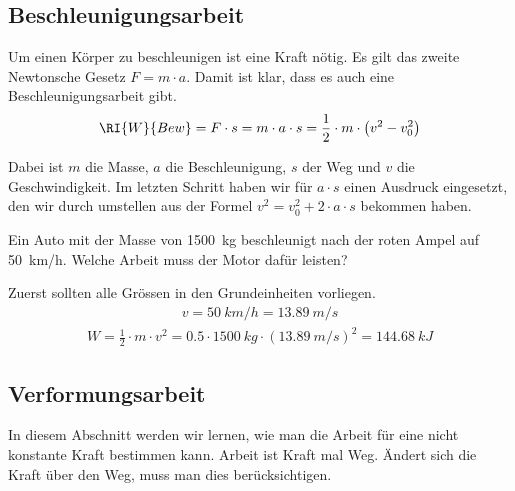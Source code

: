 \documentclass[12pt,a4paper,twoside]{article}
\begin{document}
\subsection*{Beschleunigungsarbeit}
Um einen Körper zu beschleunigen ist eine Kraft nötig. 
Es gilt das zweite Newtonsche Gesetz $F=m\cdot a$.
Damit ist klar, dass es auch eine Beschleunigungsarbeit gibt.
\begin{eqnarray*}
	\RI{W}{Bew}=F\cdot s=m\cdot a\cdot s=\frac{1}{2}\cdot m\cdot\left(v^2-v_0^2\right)
\end{eqnarray*}

Dabei ist $m$ die Masse, $a$ die Beschleunigung, $s$ der Weg und $v$ die Geschwindigkeit.
Im letzten Schritt haben wir für $a\cdot s$ einen Ausdruck eingesetzt, den wir durch umstellen aus der Formel
$v^2=v_0^2+2\cdot a\cdot s$ bekommen haben.



\begin{aufgabe}
	Ein Auto mit der Masse von \SI{1500}{kg} beschleunigt nach der roten Ampel auf \SI{50}{km/h}.
	Welche Arbeit muss der Motor dafür leisten?
	\begin{loesung}
		Zuerst sollten alle Grössen in den Grundeinheiten vorliegen.
		\begin{eqnarray*}
			v=\SI{50}{km/h}=\SI{13.89}{m/s}
		\end{eqnarray*}
		\begin{eqnarray*}
			W=\frac{1}{2}\cdot m\cdot v^2=\num{0.5}\cdot\SI{1500}{kg}\cdot(\SI{13.89}{m/s})^2=\SI{144.68}{kJ}
		\end{eqnarray*}
	\end{loesung}
\end{aufgabe}

\subsection*{Verformungsarbeit}
In diesem Abschnitt werden wir lernen, wie man die Arbeit für eine nicht konstante Kraft bestimmen kann.
Arbeit ist Kraft mal Weg. Ändert sich die Kraft über den Weg, muss man dies berücksichtigen.
\end{document}
